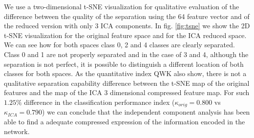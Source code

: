 \documentclass[preprint]{elsarticle}
\theoremstyle{definition} %
\theoremstyle{remark}
\begin{document}
We use a two-dimensional t-SNE visualization \citep{maaten2008visualizing} for qualitative evaluation of the difference between the quality of the separation using the 64 feature vector and of the reduced version with only 3 ICA components. In fig. \ref{fig:tsne} we show the 2D t-SNE visualization for the original feature space and for the ICA reduced space. We can see how for both spaces class 0, 2 and 4 classes are clearly separated. Class 0 and 1 are not properly separated and in the case of 3 and 4, although the separation is not perfect, it is possible to distinguish a different location of both classes for both spaces. As the quantitative index QWK also show, there is not a qualitative separation capability difference between the t-SNE map of the original features and the map of the ICA 3 dimensional compressed feature map. For such $1.25\%$ difference in the classification performance index ($\kappa_{orig} = 0.800$ vs $\kappa_{ICA} = 0.790$) we can conclude that the independent component analysis has been able to find a adequate compressed expression of the information encoded in the network. 
\end{document}
